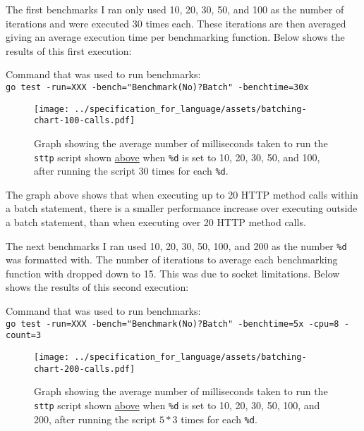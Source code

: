 \label{sec:eval-ast-nodes-batch-bench-1-intro}
The first benchmarks I ran only used 10, 20, 30, 50, and 100 as the number of iterations and were executed 30 times each. These iterations are then averaged giving an average execution time per benchmarking function. Below shows the results of this first execution:

\begin{center}
    Command that was used to run benchmarks:\\[0.5em]
    \verb|go test -run=XXX -bench="Benchmark(No)?Batch" -benchtime=30x|
\end{center}

\begin{figure}[H]
    \centering
    \texttt{[image: ../specification\_for\_language/assets/batching-chart-100-calls.pdf]}
    \cprotect\caption{Graph showing the average number of milliseconds taken to run the \verb|sttp| script shown \hyperref[sec:eval-ast-nodes-batch-bench-snippet]{above} when \verb|%d| is set to 10, 20, 30, 50, and 100, after running the script 30 times for each \verb|%d|.}
    \label{sec:eval-ast-nodes-batch-bench-1-graph}
\end{figure}

The graph above shows that when executing up to 20 HTTP method calls within a batch statement, there is a smaller performance increase over executing outside a batch statement, than when executing over 20 HTTP method calls.

\label{sec:eval-ast-nodes-batch-bench-2-intro}

The next benchmarks I ran used 10, 20, 30, 50, 100, and 200 as the number \verb|%d| was formatted with. The number of iterations to average each benchmarking function with dropped down to 15. This was due to socket limitations. Below shows the results of this second execution:

\begin{center}
    Command that was used to run benchmarks:\\[0.5em]
    \verb|go test -run=XXX -bench="Benchmark(No)?Batch" -benchtime=5x -cpu=8 -count=3|
\end{center}

\begin{figure}[H]
    \centering
    \texttt{[image: ../specification\_for\_language/assets/batching-chart-200-calls.pdf]}
    \cprotect\caption{Graph showing the average number of milliseconds taken to run the \verb|sttp| script shown \hyperref[sec:eval-ast-nodes-batch-bench-snippet]{above} when \verb|%d| is set to 10, 20, 30, 50, 100, and 200, after running the script $5 * 3$ times for each \verb|%d|.}
    \label{sec:eval-ast-nodes-batch-bench-2-graph}
\end{figure}

